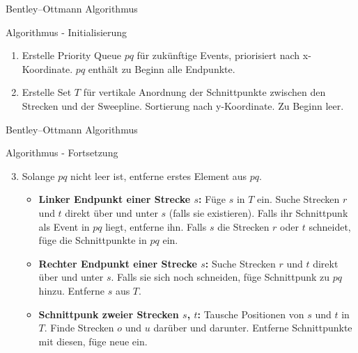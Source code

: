 \documentclass{beamer}
\begin{document}
\begin{frame}{Bentley–Ottmann Algorithmus}
	\begin{block}{Algorithmus - Initialisierung}
		\begin{enumerate}
			\item Erstelle Priority Queue $pq$ für zukünftige Events, priorisiert nach x-Koordinate. $pq$ enthält zu Beginn alle Endpunkte.
			\item Erstelle Set $T$ für vertikale Anordnung der Schnittpunkte zwischen den Strecken und der Sweepline. Sortierung nach y-Koordinate. Zu Beginn leer.
		\end{enumerate}
	\end{block}
\end{frame}

\begin{frame}{Bentley–Ottmann Algorithmus}
	\begin{block}{Algorithmus - Fortsetzung}
		\begin{enumerate}
			\setcounter{enumi}{2}
			\item Solange $pq$ nicht leer ist, entferne erstes Element aus $pq$.
			\begin{itemize}
				\item \textbf{Linker Endpunkt einer Strecke $s$:} Füge $s$ in $T$ ein. Suche Strecken $r$ und $t$ direkt über und unter $s$ (falls sie existieren). Falls ihr Schnittpunk als Event in $pq$ liegt, entferne ihn. Falls $s$ die Strecken $r$ oder $t$ schneidet, füge die Schnittpunkte in $pq$ ein.
				
				\item \textbf{Rechter Endpunkt einer Strecke $s$:} Suche Strecken $r$ und $t$ direkt über und unter $s$. Falls sie sich noch schneiden, füge Schnittpunk zu $pq$ hinzu. Entferne $s$ aus $T$. 
				
				\item \textbf{Schnittpunk zweier Strecken $s$, $t$:} Tausche Positionen von $s$ und $t$ in $T$. Finde Strecken $o$ und $u$ darüber und darunter. Entferne Schnittpunkte mit diesen, füge neue ein.
			\end{itemize}
		\end{enumerate}
	\end{block}
\end{frame}
\end{document}
